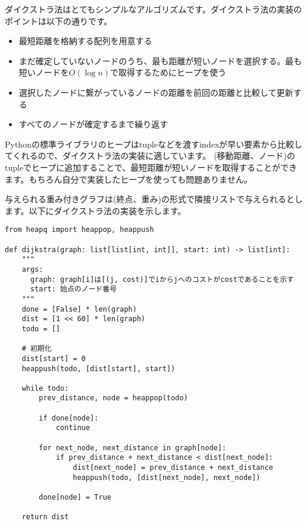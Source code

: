 \vspace{0.5cm}

ダイクストラ法はとてもシンプルなアルゴリズムです。ダイクストラ法の実装のポイントは以下の通りです。

\begin{itemize}
  \item 最短距離を格納する配列を用意する
  \item まだ確定していないノードのうち、最も距離が短いノードを選択する。最も短いノードを$O(\log n)$で取得するためにヒープを使う
  \item 選択したノードに繋がっているノードの距離を前回の距離と比較して更新する
  \item すべてのノードが確定するまで繰り返す
\end{itemize}

Pythonの標準ライブラリのヒープはtupleなどを渡すindexが早い要素から比較してくれるので、ダイクストラ法の実装に適しています。
(移動距離、ノード)のtupleでヒープに追加することで、最短距離が短いノードを取得することができます。もちろん自分で実装したヒープを使っても問題ありません。

与えられる重み付きグラフは(終点、重み)の形式で隣接リストで与えられるとします。以下にダイクストラ法の実装を示します。
\begin{lstlisting}[caption=ダイクストラ法の実装, label=dijkstra, frame=TRBL, label={dijkstra}]
from heapq import heappop, heappush

def dijkstra(graph: list[list[int, int]], start: int) -> list[int]:
    """
    args:
      graph: graph[i]は[(j, cost)]でiからjへのコストがcostであることを示す
      start: 始点のノード番号
    """
    done = [False] * len(graph)
    dist = [1 << 60] * len(graph)
    todo = []
    
    # 初期化
    dist[start] = 0
    heappush(todo, [dist[start], start])
    
    while todo:
        prev_distance, node = heappop(todo)
        
        if done[node]:
            continue
        
        for next_node, next_distance in graph[node]:
            if prev_distance + next_distance < dist[next_node]:
                dist[next_node] = prev_distance + next_distance
                heappush(todo, [dist[next_node], next_node])
        
        done[node] = True 
    
    return dist
\end{lstlisting}


